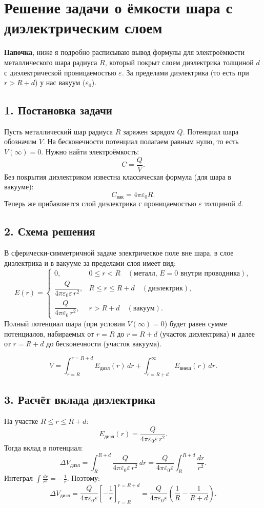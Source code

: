 \documentclass{article}
\begin{document}
\section*{Решение задачи о ёмкости шара с диэлектрическим слоем}

\textbf{Папочка}, ниже я подробно расписываю вывод формулы для электроёмкости металлического шара радиуса \(R\), который покрыт слоем диэлектрика толщиной \(d\) с диэлектрической проницаемостью \(\varepsilon\). За пределами диэлектрика (то есть при \(r > R + d\)) у нас вакуум (\(\varepsilon_0\)).

\subsection*{1. Постановка задачи}
Пусть металлический шар радиуса \(R\) заряжен зарядом \(Q\). Потенциал шара обозначим \(V\). На бесконечности потенциал полагаем равным нулю, то есть \(V(\infty) = 0\). Нужно найти электроёмкость:
\[
C = \frac{Q}{V}.
\]
Без покрытия диэлектриком известна классическая формула (для шара в вакууме):
\[
C_{\text{вак}} = 4 \pi \varepsilon_0 R.
\]
Теперь же прибавляется слой диэлектрика с проницаемостью \(\varepsilon\) толщиной \(d\).

\subsection*{2. Схема решения}
В сферически-симметричной задаче электрическое поле вне шара, в слое диэлектрика и в вакууме за пределами слоя имеет вид:
\[
E(r) =
\begin{cases}
0, & 0 \leq r < R \quad (\text{металл, }E=0\text{ внутри проводника}), \\
\dfrac{Q}{4\pi\varepsilon_0 \varepsilon \, r^2}, & R \leq r \leq R+d \quad (\text{диэлектрик}), \\
\dfrac{Q}{4\pi\varepsilon_0 \, r^2}, & r > R + d \quad (\text{вакуум}).
\end{cases}
\]
Полный потенциал шара (при условии \(V(\infty)=0\)) будет равен сумме потенциалов, набираемых от \(r=R\) до \(r=R+d\) (участок диэлектрика) и далее от \(r=R+d\) до бесконечности (участок вакуума).

\[
V = \int_{r=R}^{r=R+d} E_{\text{диэл}}(r)\,dr
   + \int_{r=R+d}^{\infty} E_{\text{внеш}}(r)\,dr.
\]

\subsection*{3. Расчёт вклада диэлектрика}
На участке \(R \le r \le R+d\):
\[
E_{\text{диэл}}(r)
= \frac{Q}{4\pi \varepsilon_0 \varepsilon \, r^2}.
\]
Тогда вклад в потенциал:
\[
\Delta V_{\text{диэл}}
= \int_{R}^{R+d} \frac{Q}{4\pi \varepsilon_0 \varepsilon\,r^2}\,dr
= \frac{Q}{4\pi \varepsilon_0 \varepsilon}
\int_{R}^{R+d} \frac{dr}{r^2}.
\]
Интеграл \(\int \frac{dr}{r^2} = -\frac{1}{r}\). Поэтому:
\[
\Delta V_{\text{диэл}}
= \frac{Q}{4\pi \varepsilon_0 \varepsilon}
\left[-\frac{1}{r}\right]_{r=R}^{r=R+d}
= \frac{Q}{4\pi \varepsilon_0 \varepsilon}
\left(\frac{1}{R} - \frac{1}{R + d}\right).
\]
\end{document}
